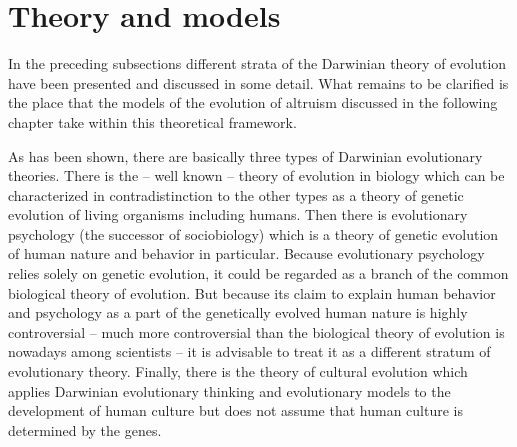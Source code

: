 \section{Theory and models}
\label{theoryAndModels}
In the preceding subsections different strata of the Darwinian theory of
evolution have been presented and discussed in some detail. What remains to be
clarified is the place that the models of the evolution of altruism discussed
in the following chapter take within this theoretical framework.

As has been shown, there are basically three types of Darwinian evolutionary
theories. There is the -- well known -- theory of evolution in biology which
can be characterized in contradistinction to the other types as a theory of
genetic evolution of living organisms including humans. Then there is
evolutionary psychology (the successor of sociobiology) which is a theory of
genetic evolution of human nature and behavior in particular. Because
evolutionary psychology relies solely on genetic evolution, it could be
regarded as a branch of the common biological theory of evolution. But because
its claim to explain human behavior and psychology as a part of the genetically
evolved human nature is highly controversial -- much more controversial than
the biological theory of evolution is nowadays among scientists -- it is
advisable to treat it as a different stratum of evolutionary theory. Finally,
there is the theory of cultural evolution which applies Darwinian evolutionary
thinking and evolutionary models to the development of human culture but does
not assume that human culture is determined by the genes.


